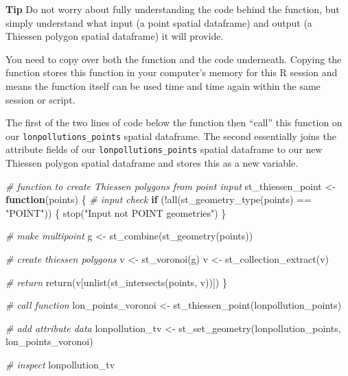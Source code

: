 \documentclass[
]{book}
\newenvironment{Shaded}{\begin{snugshade}}{\end{snugshade}}
\newcommand{\CommentTok}[1]{\textcolor[rgb]{0.56,0.35,0.01}{\textit{#1}}}
\newcommand{\ControlFlowTok}[1]{\textcolor[rgb]{0.13,0.29,0.53}{\textbf{#1}}}
\newcommand{\FunctionTok}[1]{\textcolor[rgb]{0.00,0.00,0.00}{#1}}
\newcommand{\NormalTok}[1]{#1}
\newcommand{\OtherTok}[1]{\textcolor[rgb]{0.56,0.35,0.01}{#1}}
\newcommand{\SpecialCharTok}[1]{\textcolor[rgb]{0.00,0.00,0.00}{#1}}
\newcommand{\StringTok}[1]{\textcolor[rgb]{0.31,0.60,0.02}{#1}}
\begin{document}
\textbf{Tip}
Do not worry about fully understanding the code behind the function, but simply understand what input (a point spatial dataframe) and output (a Thiessen polygon spatial dataframe) it will provide.

You need to copy over both the function and the code underneath. Copying the function stores this function in your computer's memory for this R session and means the function itself can be used time and time again within the same session or script.

The first of the two lines of code below the function then ``call'' this function on our \texttt{lonpollutions\_points} spatial dataframe. The second essentially joins the attribute fields of our \texttt{lonpollutions\_points} spatial dataframe to our new Thiessen polygon spatial dataframe and stores this as a new variable.

\begin{Shaded}
\begin{Highlighting}[]
\CommentTok{\# function to create Thiessen polygons from point input}
\NormalTok{st\_thiessen\_point }\OtherTok{\textless{}{-}} \ControlFlowTok{function}\NormalTok{(points) \{}
  \CommentTok{\# input check}
  \ControlFlowTok{if}\NormalTok{ (}\SpecialCharTok{!}\FunctionTok{all}\NormalTok{(}\FunctionTok{st\_geometry\_type}\NormalTok{(points) }\SpecialCharTok{==} \StringTok{"POINT"}\NormalTok{)) \{}
    \FunctionTok{stop}\NormalTok{(}\StringTok{"Input not POINT geometries"}\NormalTok{)}
\NormalTok{  \}}

  \CommentTok{\# make multipoint}
\NormalTok{  g }\OtherTok{\textless{}{-}} \FunctionTok{st\_combine}\NormalTok{(}\FunctionTok{st\_geometry}\NormalTok{(points))}

  \CommentTok{\# create thiessen polygons}
\NormalTok{  v }\OtherTok{\textless{}{-}} \FunctionTok{st\_voronoi}\NormalTok{(g)}
\NormalTok{  v }\OtherTok{\textless{}{-}} \FunctionTok{st\_collection\_extract}\NormalTok{(v)}

  \CommentTok{\# return}
  \FunctionTok{return}\NormalTok{(v[}\FunctionTok{unlist}\NormalTok{(}\FunctionTok{st\_intersects}\NormalTok{(points, v))])}
\NormalTok{\}}

\CommentTok{\# call function}
\NormalTok{lon\_points\_voronoi }\OtherTok{\textless{}{-}} \FunctionTok{st\_thiessen\_point}\NormalTok{(lonpollution\_points)}

\CommentTok{\# add attribute data}
\NormalTok{lonpollution\_tv }\OtherTok{\textless{}{-}} \FunctionTok{st\_set\_geometry}\NormalTok{(lonpollution\_points, lon\_points\_voronoi)}

\CommentTok{\# inspect}
\NormalTok{lonpollution\_tv}
\end{Highlighting}
\end{Shaded}
\end{document}
